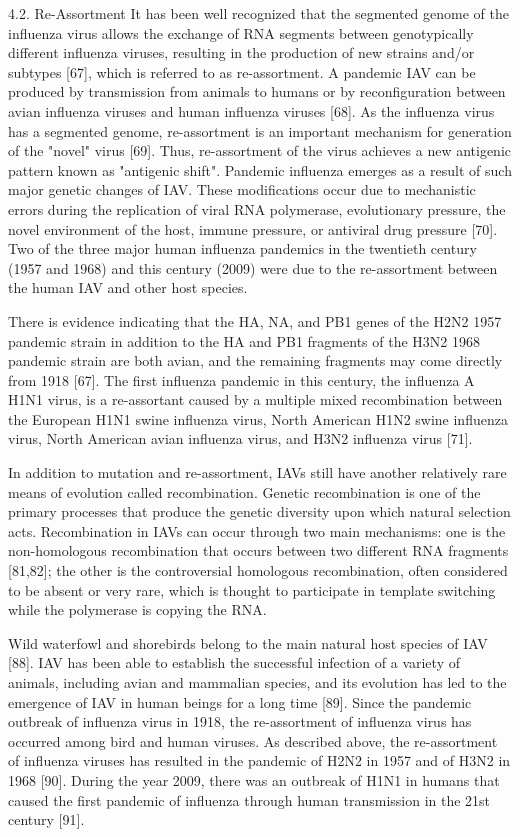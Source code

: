 \documentclass[onecolumn, compsoc,10pt]{IEEEtran}
\begin{document}
{4.2. Re-Assortment
It has been well recognized that the segmented genome of the influenza virus allows the exchange of RNA segments between genotypically different influenza viruses, resulting in the production of new strains and/or subtypes [67], which is referred to as re-assortment. A pandemic IAV can be produced by transmission from animals to humans or by reconfiguration between avian influenza viruses and human influenza viruses [68]. As the influenza virus has a segmented genome, re-assortment is an important mechanism for generation of the "novel" virus [69]. Thus, re-assortment of the virus achieves a new antigenic pattern known as "antigenic shift". Pandemic influenza emerges as a result of such major genetic changes of IAV. These modifications occur due to mechanistic errors during the replication of viral RNA polymerase, evolutionary pressure, the novel environment of the host, immune pressure, or antiviral drug pressure [70]. Two of the three major human influenza pandemics in the twentieth century (1957 and 1968) and this century (2009) were due to the re-assortment between the human IAV and other host species.


There is evidence indicating that the HA, NA, and PB1 genes of the H2N2 1957 pandemic strain in addition to the HA and PB1 fragments of the H3N2 1968 pandemic strain are both avian, and the remaining fragments may come directly from 1918 [67]. The first influenza pandemic in this century, the influenza A H1N1 virus, is a re-assortant caused by a multiple mixed recombination between the European H1N1 swine influenza virus, North American H1N2 swine influenza virus, North American avian influenza virus, and H3N2 influenza virus [71].

In addition to mutation and re-assortment, IAVs still have another relatively rare means of evolution called recombination. Genetic recombination is one of the primary processes that produce the genetic diversity upon which natural selection acts. Recombination in IAVs can occur through two main mechanisms: one is the non-homologous recombination that occurs between two different RNA fragments [81,82]; the other is the controversial homologous recombination, often considered to be absent or very rare, which is thought to participate in template switching while the polymerase is copying the RNA.



Wild waterfowl and shorebirds belong to the main natural host species of IAV [88]. IAV has been able to establish the successful infection of a variety of animals, including avian and mammalian species, and its evolution has led to the emergence of IAV in human beings for a long time [89]. Since the pandemic outbreak of influenza virus in 1918, the re-assortment of influenza virus has occurred among bird and human viruses. As described above, the re-assortment of influenza viruses has resulted in the pandemic of H2N2 in 1957 and of H3N2 in 1968 [90]. During the year 2009, there was an outbreak of H1N1 in humans that caused the first pandemic of influenza through human transmission in the 21st century [91].

}
\end{document}
